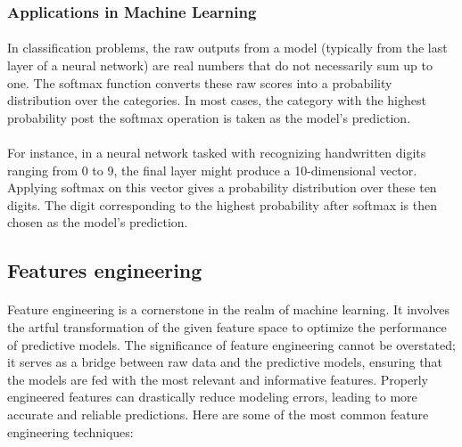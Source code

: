         \subsubsection{Applications in Machine Learning}

            \paragraph{}In classification problems, the raw outputs from a model (typically from the last layer of a neural network) are real numbers that do not necessarily sum up to one. The softmax function converts these raw scores into a probability distribution over the categories. In most cases, the category with the highest probability post the softmax operation is taken as the model's prediction.

            \paragraph{}For instance, in a neural network tasked with recognizing handwritten digits ranging from 0 to 9, the final layer might produce a 10-dimensional vector. Applying softmax on this vector gives a probability distribution over these ten digits. The digit corresponding to the highest probability after softmax is then chosen as the model's prediction.


    \subsection{Features engineering}
        \paragraph{}Feature engineering\cite{khurana_feature_2017} is a cornerstone in the realm of machine learning. It involves the artful transformation of the given feature space to optimize the performance of predictive models. The significance of feature engineering cannot be overstated; it serves as a bridge between raw data and the predictive models, ensuring that the models are fed with the most relevant and informative features. Properly engineered features can drastically reduce modeling errors, leading to more accurate and reliable predictions. Here are some of the most common feature engineering techniques:

